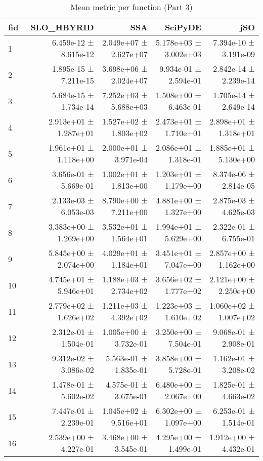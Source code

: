 \begin{table}[htbp]
    \centering
    \caption{Mean metric per function (Part 3)}
    \label{tab:mean_all_part3}
    \begin{tabular}{lrrrr}
    \toprule
    fid & SLO_HBYRID & SSA & SciPyDE & jSO \\
    \midrule
    1 & 6.459e-12 ± 8.615e-12 & 2.049e+07 ± 2.627e+07 & 5.178e+03 ± 3.002e+03 & 7.394e-10 ± 3.191e-09 \\
2 & 1.895e-15 ± 7.211e-15 & 3.698e+06 ± 2.024e+07 & 9.934e-01 ± 2.594e-01 & 2.842e-14 ± 2.239e-14 \\
3 & 5.684e-15 ± 1.734e-14 & 7.252e+03 ± 5.688e+03 & 1.508e+00 ± 6.463e-01 & 1.705e-14 ± 2.649e-14 \\
4 & 2.913e+01 ± 1.287e+01 & 1.527e+02 ± 1.803e+02 & 2.473e+01 ± 1.710e+01 & 2.898e+01 ± 1.318e+01 \\
5 & 1.961e+01 ± 1.118e+00 & 2.000e+01 ± 3.971e-04 & 2.086e+01 ± 1.318e-01 & 1.885e+01 ± 5.130e+00 \\
6 & 3.656e-01 ± 5.669e-01 & 1.002e+01 ± 1.813e+00 & 1.203e+01 ± 1.179e+00 & 8.374e-06 ± 2.814e-05 \\
7 & 2.133e-03 ± 6.053e-03 & 8.790e+00 ± 7.211e+00 & 4.881e+00 ± 1.327e+00 & 2.875e-03 ± 4.625e-03 \\
8 & 3.383e+00 ± 1.269e+00 & 3.532e+01 ± 1.564e+01 & 1.994e+01 ± 5.629e+00 & 2.322e-01 ± 6.755e-01 \\
9 & 5.845e+00 ± 2.074e+00 & 4.029e+01 ± 1.184e+01 & 3.451e+01 ± 7.047e+00 & 2.857e+00 ± 1.162e+00 \\
10 & 4.745e+01 ± 5.946e+01 & 1.188e+03 ± 2.734e+02 & 3.656e+02 ± 1.777e+02 & 2.121e+00 ± 2.250e+00 \\
11 & 2.779e+02 ± 1.626e+02 & 1.211e+03 ± 4.392e+02 & 1.223e+03 ± 1.610e+02 & 1.060e+02 ± 1.007e+02 \\
12 & 2.312e-01 ± 1.504e-01 & 1.005e+00 ± 3.732e-01 & 3.250e+00 ± 7.504e-01 & 9.068e-01 ± 2.908e-01 \\
13 & 9.312e-02 ± 3.086e-02 & 5.563e-01 ± 1.835e-01 & 3.858e+00 ± 5.728e-01 & 1.162e-01 ± 3.208e-02 \\
14 & 1.478e-01 ± 5.602e-02 & 4.575e-01 ± 3.675e-01 & 6.480e+00 ± 2.067e+00 & 1.825e-01 ± 4.663e-02 \\
15 & 7.447e-01 ± 2.239e-01 & 1.045e+02 ± 9.516e+01 & 6.302e+00 ± 1.097e+00 & 6.253e-01 ± 1.514e-01 \\
16 & 2.539e+00 ± 4.227e-01 & 3.468e+00 ± 3.545e-01 & 4.295e+00 ± 1.499e-01 & 1.912e+00 ± 4.432e-01 \\

\end{tabular}
\end{table}
